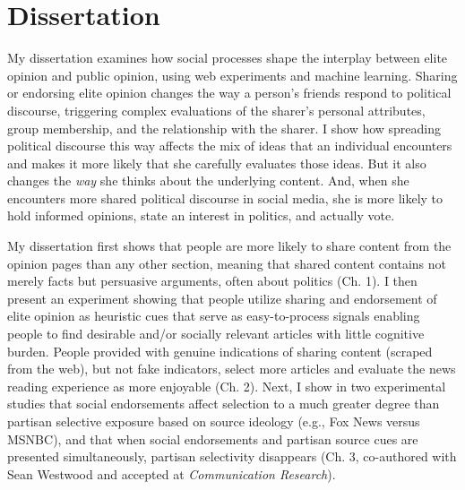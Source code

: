 \documentclass[12pt]{article}
\begin{document}

\section*{Dissertation}
My dissertation examines how social processes shape the interplay between elite opinion and public opinion, using web experiments and machine learning.  Sharing or endorsing elite opinion changes the way a person's friends respond to political discourse, triggering complex evaluations of the sharer's personal attributes, group membership, and the relationship with the sharer.  I show how spreading political discourse this way affects the mix of ideas that an individual encounters and makes it more likely that she carefully evaluates those ideas.  But it also changes the \emph{way} she thinks about the underlying content.  And, when she encounters more shared political discourse in social media, she is more likely to hold informed opinions, state an interest in politics, and actually vote.  





My dissertation first shows that people are more likely to share content from the opinion pages than any other section, meaning that shared content contains not merely facts but persuasive arguments, often about politics (Ch. 1).  I then present an experiment showing that people utilize sharing and endorsement of elite opinion as heuristic cues that serve as easy-to-process signals enabling people to find desirable and/or socially relevant articles with little cognitive burden.  People provided with genuine indications of sharing content (scraped from the web), but not fake indicators, select more articles and evaluate the news reading experience as more enjoyable (Ch. 2).  Next, I show in two experimental studies that social endorsements affect selection to a much greater degree than partisan selective exposure based on source ideology (e.g., Fox News versus MSNBC), and that when social endorsements and partisan source cues are presented simultaneously, partisan selectivity disappears (Ch. 3, co-authored with Sean Westwood and accepted at \emph{Communication Research}).  
\end{document}
